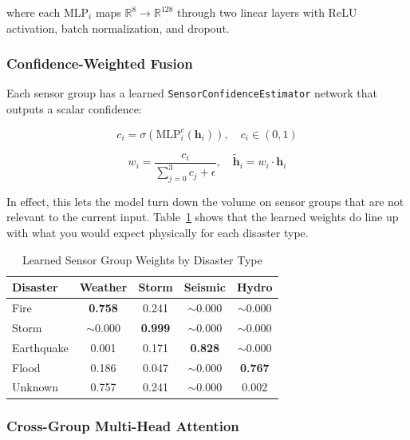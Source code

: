 \documentclass[journal]{IEEEtran}
\begin{document}
where each $\text{MLP}_i$ maps $\mathbb{R}^8 \to \mathbb{R}^{128}$ through two linear layers with ReLU activation, batch normalization, and dropout.

\subsubsection{Confidence-Weighted Fusion}

Each sensor group has a learned \texttt{SensorConfidenceEstimator} network that outputs a scalar confidence:

\begin{equation}
c_i = \sigma(\text{MLP}^c_i(\mathbf{h}_i)), \quad c_i \in (0, 1)
\end{equation}

\begin{equation}
w_i = \frac{c_i}{\sum_{j=0}^{3} c_j + \epsilon}, \quad \tilde{\mathbf{h}}_i = w_i \cdot \mathbf{h}_i
\end{equation}

In effect, this lets the model turn down the volume on sensor groups that are not relevant to the current input. Table~\ref{tab:sensor_weights} shows that the learned weights do line up with what you would expect physically for each disaster type.

\begin{table}[!t]
\centering
\caption{Learned Sensor Group Weights by Disaster Type}
\label{tab:sensor_weights}
\begin{tabular}{lcccc}
\toprule
\textbf{Disaster} & \textbf{Weather} & \textbf{Storm} & \textbf{Seismic} & \textbf{Hydro} \\
\midrule
Fire       & \textbf{0.758} & 0.241 & $\sim$0.000 & $\sim$0.000 \\
Storm      & $\sim$0.000 & \textbf{0.999} & $\sim$0.000 & $\sim$0.000 \\
Earthquake & 0.001 & 0.171 & \textbf{0.828} & $\sim$0.000 \\
Flood      & 0.186 & 0.047 & $\sim$0.000 & \textbf{0.767} \\
Unknown    & 0.757 & 0.241 & $\sim$0.000 & 0.002 \\
\bottomrule
\end{tabular}
\end{table}

\subsubsection{Cross-Group Multi-Head Attention}
\end{document}
